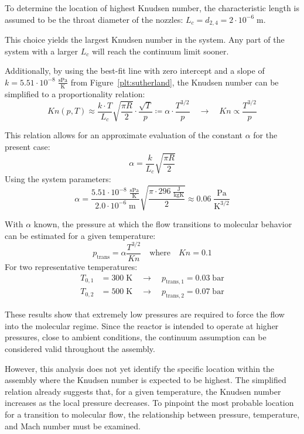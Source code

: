 	To determine the location of highest Knudsen number, the characteristic length is assumed to be the throat diameter of the nozzles: $L_c = d_{2,4} = 2 \cdot 10^{-6}\;\text{m}$.
	
	This choice yields the largest Knudsen number in the system.
	Any part of the system with a larger $L_c$ will reach the continuum limit sooner.

	Additionally, by using the best-fit line with zero intercept and a slope of $k = 5.51 \cdot10^{-8}\; \frac{\text{sPa}}{\text{K}}$ from Figure~\ref{plt:sutherland}, the Knudsen number can be simplified to a proportionality relation:
	\begin{equation}
		Kn(p,T) \approx
		\frac{ k \cdot T }{ L_c } \sqrt{ \frac{ \pi R }{ 2 } } \cdot \frac{ \sqrt{ T } }{ p }
		\coloneqq \alpha \cdot \frac{ T^{ 3/2 } }{ p }
		\quad \rightarrow \quad
		Kn \propto \frac{ T^{ 3/2 } }{ p }
	\end{equation}

	This relation allows for an approximate evaluation of the constant $\alpha$ for the present case:
	$$
		\alpha = \frac{k}{L_c}\sqrt{\frac{\pi R}{2}}
	$$
	Using the system parameters:
	$$
		\alpha = \frac{5.51 \cdot 10^{-8}\; \frac{\text{sPa}}{\text{K}}}{2.0 \cdot 10^{-6}\;\text{m}} \sqrt{\frac{\pi \cdot 296\; \frac{\text{J}}{\text{kgK}}}{2}}
		\approx 0.06\; \frac{\text{Pa}}{\text{K}^{3/2}}
	$$

	With $\alpha$ known, the pressure at which the flow transitions to molecular behavior can be estimated for a given temperature:
	$$
		p_\text{trans} = \alpha \frac{T^{3/2}}{Kn} \quad \text{where} \quad Kn = 0.1
	$$
	For two representative temperatures:
	\begin{align*}
		T_{0,1} &= 300\;\text{K} \quad \to \quad p_{\text{trans},1} = 0.03\;\text{bar}\\
		T_{0,2} &= 500\;\text{K} \quad \to \quad p_{\text{trans},2} = 0.07\;\text{bar}
	\end{align*}

	These results show that extremely low pressures are required to force the flow into the molecular regime.
	Since the reactor is intended to operate at higher pressures, close to ambient conditions, the continuum assumption can be considered valid throughout the assembly.

	However, this analysis does not yet identify the specific location within the assembly where the Knudsen number is expected to be highest.
	The simplified relation already suggests that, for a given temperature, the Knudsen number increases as the local pressure decreases.
	To pinpoint the most probable location for a transition to molecular flow, the relationship between pressure, temperature, and Mach number must be examined.

